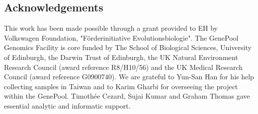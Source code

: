 \documentclass[10pt]{bmc_article}
\newenvironment{bmcformat}{\begin{raggedright}\baselineskip20pt\sloppy\setboolean{publ}{false}}{\end{raggedright}\baselineskip20pt\sloppy}
\begin{document}
\begin{bmcformat}
\section*{Acknowledgements}

This work has been made possible through a grant provided to EH by
Volkswagen Foundation, "F\"{o}rderinitiative Evolutionsbiologie". The
GenePool Genomics Facility is core funded by The School of Biological
Sciences, University of Edinburgh, the Darwin Trust of Edinburgh, the
UK Natural Environment Research Council (award reference R8/H10/56)
and the UK Medical Research Council (award reference G0900740). We are
grateful to Yun-San Han for his help collecting samples in Taiwan and
to Karim Gharbi for overseeing the project within the
GenePool. Timoth\'ee Cezard, Sujai Kumar and Graham Thomas gave
essential analytic and informatic support.


{
  
} %


\newpage


\end{bmcformat}
\end{document}
